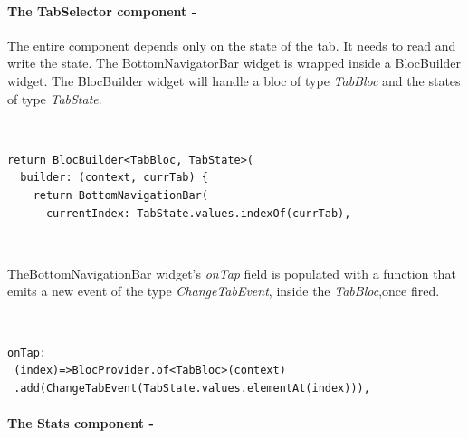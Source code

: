 \paragraph{The TabSelector component - }
\label{subpar:todo_app_bloc_core_state}

The entire component depends only on the state of the tab. It needs to read and write the state. The BottomNavigatorBar widget is wrapped inside a BlocBuilder widget. The BlocBuilder widget will handle a bloc of type \textit{TabBloc} and the states of type \textit{TabState}.
\begin{code}
\mbox{}\\
 \mbox{}
\label{code:2.14}
\begin{verbatim}
return BlocBuilder<TabBloc, TabState>(
  builder: (context, currTab) {
    return BottomNavigationBar(
      currentIndex: TabState.values.indexOf(currTab),
\end{verbatim}
\mbox{}\\
\end{code}
TheBottomNavigationBar widget’s \textit{onTap} field is populated with a function that emits a new event of the type \textit{ChangeTabEvent}, inside the \textit{TabBloc},once fired.
\begin{code}
\mbox{}\\
 \mbox{}
\label{code:2.14}
\begin{verbatim}
onTap:
 (index)=>BlocProvider.of<TabBloc>(context)
 .add(ChangeTabEvent(TabState.values.elementAt(index))),
\end{verbatim}
\mbox{}
\end{code}


\paragraph{The Stats component - }
\label{subpar:todo_app_bloc_core_state}

